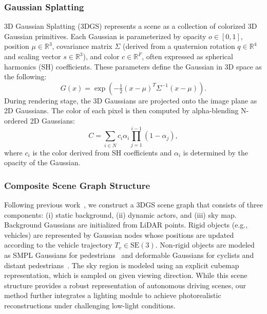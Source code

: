 \documentclass[letterpaper, 10 pt, conference]{ieeeconf}  %
\begin{document}
\subsubsection{Gaussian Splatting}
3D Gaussian Splatting (3DGS) \cite{kerbl20233d} represents a scene as a collection of colorized 3D Gaussian primitives. Each Gaussian is parameterized by opacity $o \in [0,1]$, position $\mu \in \mathbb{R}^3$, covariance matrix $\Sigma$ (derived from a quaternion rotation $q \in \mathbb{R}^4$ and scaling vector $s \in \mathbb{R}^3$), and color $c \in \mathbb{R}^F$, often expressed as spherical harmonics (SH) coefficients.
%
These parameters define the Gaussian in 3D space as the following:\begin{equation}
G(x) = \exp\left(-\tfrac{1}{2}(x-\mu)^{T}\Sigma^{-1}(x-\mu)\right).
\label{3DGS}
\end{equation}
%
During rendering stage, the 3D Gaussians are projected onto the image plane as 2D Gaussians. The color of each pixel is then computed by alpha-blending N-ordered 2D Gaussians:
\begin{equation}
C = \sum_{i \in N} c_i \alpha_i \prod_{j=1}^{i-1} (1 - \alpha_j),
\label{color blending}
\end{equation}
where $c_i$ is the color derived from SH coefficients and $\alpha_i$
is determined by the opacity of the Gaussian.

\subsubsection{Composite Scene Graph Structure}
Following previous work~\cite{chen2025omnire,yan2024street,wu2025armgs,zhou2024drivinggaussian,chen2023periodic,ren2024unigaussian}, we construct a 3DGS scene graph that consists of three components: (i) static background, (ii) dynamic actors, and (iii) sky map. Background Gaussians are initialized from LiDAR points. Rigid objects (e.g., vehicles) are represented by Gaussian nodes whose positions are updated according to the vehicle trajectory $T_v \in \mathrm{SE}(3)$. Non-rigid objects are modeled as SMPL Gaussians for pedestrians~\cite{chen2025omnire} and deformable Gaussians for cyclists and distant pedestrians~\cite{yang2024deformable}. The sky region is modeled using an explicit cubemap representation, which is sampled on given viewing direction.
%
While this scene structure provides a robust representation of autonomous driving scenes, our method further integrates a lighting module to achieve photorealistic reconstructions under challenging low-light conditions.
\end{document}
